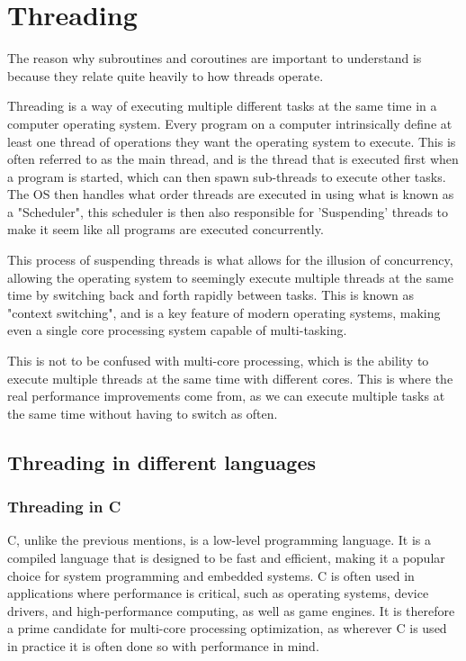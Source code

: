 \documentclass[12pt,a4paper]{article}
\begin{document}
\section{Threading}

The reason why subroutines and coroutines are important to understand is because they relate quite heavily to how threads operate. 

Threading is a way of executing multiple different tasks at the same time in a computer operating system. Every program on a computer intrinsically define at least one thread of operations they want the operating system to execute. This is often referred to as the main thread, and is the thread that is executed first when a program is started, which can then spawn sub-threads to execute other tasks. The OS then handles what order threads are executed in using what is known as a "Scheduler", this scheduler is then also responsible for 'Suspending' threads to make it seem like all programs are executed concurrently. 

This process of suspending threads is what allows for the illusion of concurrency, allowing the operating system to seemingly execute multiple threads at the same time by switching back and forth rapidly between tasks. This is known as "context switching", and is a key feature of modern operating systems, making even a single core processing system capable of multi-tasking.

This is not to be confused with multi-core processing, which is the ability to execute multiple threads at the same time with different cores. This is where the real performance improvements come from, as we can execute multiple tasks at the same time without having to switch as often.

\subsection{Threading in different languages}

\subsubsection{Threading in C}

C, unlike the previous mentions, is a low-level programming language. It is a compiled language that is designed to be fast and efficient, making it a popular choice for system programming and embedded systems. C is often used in applications where performance is critical, such as operating systems, device drivers, and high-performance computing, as well as game engines. It is therefore a prime candidate for multi-core processing optimization, as wherever C is used in practice it is often done so with performance in mind.
\end{document}
